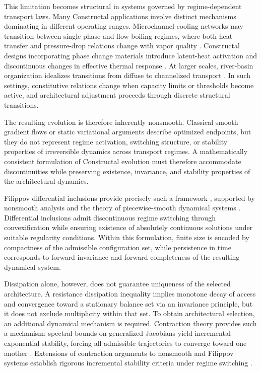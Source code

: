 \documentclass[12pt]{article}
\theoremstyle{plain}
\theoremstyle{definition}
\theoremstyle{remark}
\begin{document}
This limitation becomes structural in systems governed by regime-dependent transport laws. Many Constructal applications involve distinct mechanisms dominating in different operating ranges. Microchannel cooling networks may transition between single-phase and flow-boiling regimes, where both heat-transfer and pressure-drop relations change with vapor quality \cite{Zhang2011IJHMT,Ariyo2020IJHMT,AriyoBelloOchende2021ICHMT}. Constructal designs incorporating phase change materials introduce latent-heat activation and discontinuous changes in effective thermal response \cite{Arshad2025PCM_ICHMT,LorenteBejan2019CurrentTrends}. At larger scales, river-basin organization idealizes transitions from diffuse to channelized transport \cite{Reis2006Geomorphology}. In such settings, constitutive relations change when capacity limits or thresholds become active, and architectural adjustment proceeds through discrete structural transitions.

The resulting evolution is therefore inherently nonsmooth. Classical smooth gradient flows or static variational arguments describe optimized endpoints, but they do not represent regime activation, switching structure, or stability properties of irreversible dynamics across transport regimes. A mathematically consistent formulation of Constructal evolution must therefore accommodate discontinuities while preserving existence, invariance, and stability properties of the architectural dynamics.

Filippov differential inclusions provide precisely such a framework \cite{Filippov1988}, supported by nonsmooth analysis \cite{Clarke1983} and the theory of piecewise-smooth dynamical systems \cite{diBernardo2008,Cortes2009}. Differential inclusions admit discontinuous regime switching through convexification while ensuring existence of absolutely continuous solutions under suitable regularity conditions. Within this formulation, finite size is encoded by compactness of the admissible configuration set, while persistence in time corresponds to forward invariance and forward completeness of the resulting dynamical system.

Dissipation alone, however, does not guarantee uniqueness of the selected architecture. A resistance dissipation inequality implies monotone decay of access and convergence toward a stationary balance set via an invariance principle, but it does not exclude multiplicity within that set. To obtain architectural selection, an additional dynamical mechanism is required. Contraction theory provides such a mechanism: spectral bounds on generalized Jacobians yield incremental exponential stability, forcing all admissible trajectories to converge toward one another \cite{LohmillerSlotine1998}. Extensions of contraction arguments to nonsmooth and Filippov systems establish rigorous incremental stability criteria under regime switching \cite{StiefenhoferGiesl2019NADE,Stiefenhofer2020NADE,StiefenhoferCAMS2025,StiefenhoferPLA2025}.
\end{document}
